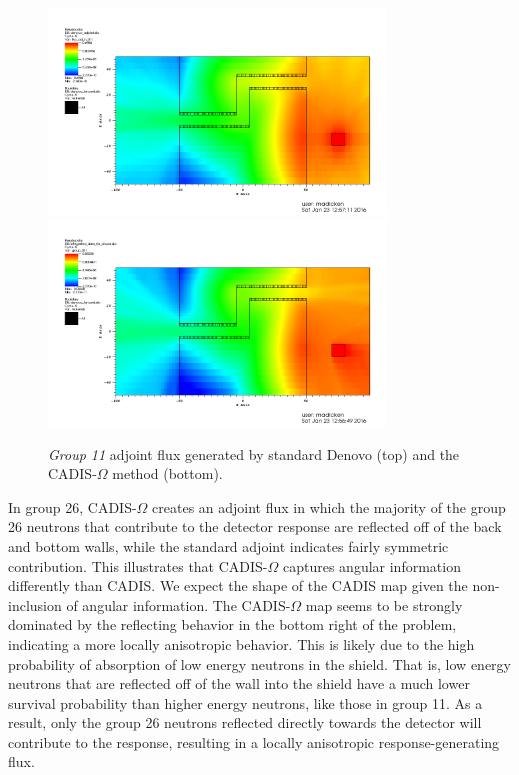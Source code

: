 \documentclass[12pt]{article}
\begin{document}
\begin{figure}
  \begin{center}
    \includegraphics[width=0.80\textwidth]{./images/maze2_adjoint_group11_adjusted.png}
    \includegraphics[width=0.80\textwidth]{./images/maze2_myflux_group11_adjusted.png}
    \caption[]{\label{fig::adjoint_fluxes_group11}\textit{Group 11} adjoint flux generated by standard Denovo (top) and the CADIS-$\Omega$ method (bottom).}
  \end{center}
\end{figure}

In group 26, CADIS-$\Omega$ creates an adjoint flux in which the majority of the group 26 neutrons that contribute to the detector response are reflected off of the back and bottom walls, while the standard adjoint indicates fairly symmetric contribution. 
This illustrates that CADIS-$\Omega$ captures angular information differently than CADIS. 
We expect the shape of the CADIS map given the non-inclusion of angular information. 
The CADIS-$\Omega$ map seems to be strongly dominated by the reflecting behavior in the bottom right of the problem, indicating a more locally anisotropic behavior. This is likely due to the high probability of absorption of low energy neutrons in the shield. That is, low energy neutrons that are reflected off of the wall into the shield have a much lower survival probability than higher energy neutrons, like those in group 11. As a result, only the group 26 neutrons reflected directly towards the detector will contribute to the response, resulting in a locally anisotropic response-generating flux. 
\end{document}
